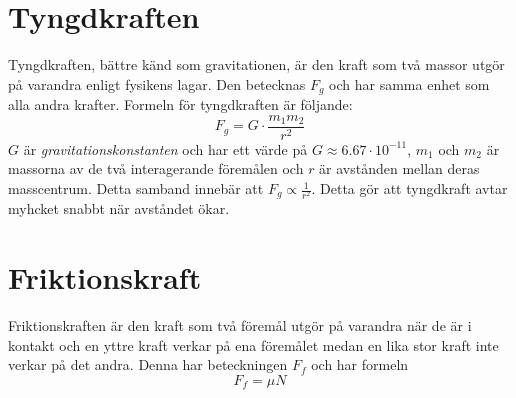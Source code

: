 \section{Tyngdkraften}
Tyngdkraften, bättre känd som gravitationen, är den kraft som två massor utgör på varandra enligt fysikens lagar. Den betecknas $F_g$ och har samma enhet som alla andra krafter. Formeln för tyngdkraften är följande:
\begin{equation*}
    F_g = G \cdot \frac{m_1m_2}{r^2}
\end{equation*}
$G$ är \emph{gravitationskonstanten} och har ett värde på $G \approx 6.67 \cdot 10^{-11}$, $m_1$ och $m_2$ är massorna av de två interagerande föremålen och $r$ är avstånden mellan deras masscentrum. Detta samband innebär att $F_g \hyperref[def:propto]{\propto} \frac{1}{r^2}$. Detta gör att tyngdkraft avtar myhcket snabbt när avståndet ökar.

\section{Friktionskraft}
Friktionskraften är den kraft som två föremål utgör på varandra när de är i kontakt och en yttre kraft verkar på ena föremålet medan en lika stor kraft inte verkar på det andra. Denna har beteckningen $F_f$ och har formeln
\begin{equation*}
    F_f = \mu N
\end{equation*}